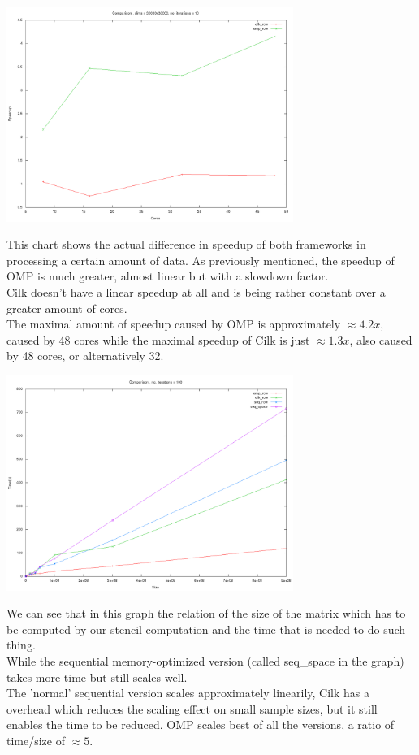 \documentclass[11pt]{article}
\begin{document}
\begin{center}
\includegraphics[width=0.7\textwidth]{compsxcompcilompcilkseqk.png}
\end{center}
This chart shows the actual difference in speedup of both frameworks in processing a certain amount of data. As previously mentioned, the speedup of OMP is much greater, almost linear but with a slowdown factor.\\
Cilk doesn't have a linear speedup at all and is being rather constant over a greater amount of cores.\\
The maximal amount of speedup caused by OMP is approximately $\approx4.2x$, caused by 48 cores while the maximal speedup of Cilk is just $\approx1.3x$, also caused by 48 cores, or alternatively 32.
\begin{center}


\includegraphics[width=0.7\textwidth]{compsxtompcilkseq.png}
\end{center}
We can see that in this graph the relation of the size of the matrix which has to be computed by our stencil computation and the time that is needed to do such thing.\\
While the sequential memory-optimized version (called seq\_space in the graph) takes more time but still scales well. \\
The 'normal' sequential version scales approximately linearily, Cilk has a overhead which reduces the scaling effect on small sample sizes, but it still enables the time to be reduced. OMP scales best of all the versions, a ratio of time/size of $\approx5$.
\end{document}
